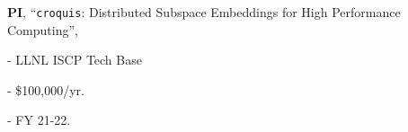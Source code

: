 \begin{innerlist}
  \item[] \textbf{PI},
  ``\texttt{croquis}: Distributed Subspace Embeddings for High Performance Computing'',
  \begin{innerlist}
    \item[-] LLNL ISCP Tech Base
    \item[-] \$100,000/yr.
    \item[-] FY 21-22.
  \end{innerlist}

\end{innerlist}
